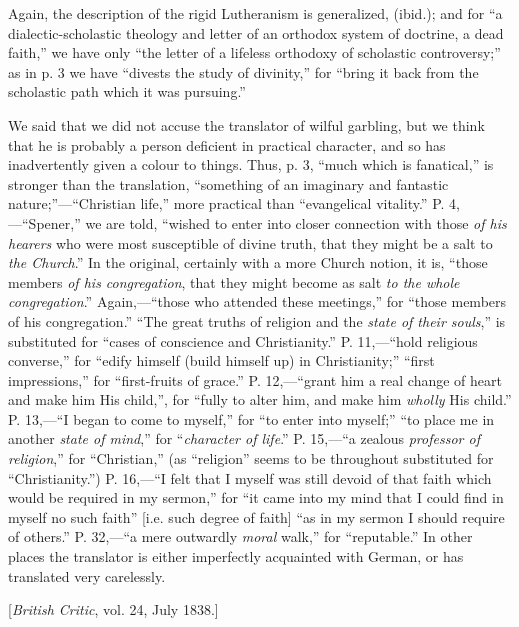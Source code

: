 Again, the description of the rigid Lutheranism is
generalized, (ibid.); and for ``a dialectic-scholastic theology and
letter of an orthodox system of doctrine, a dead faith,'' we have only ``the
letter of a lifeless orthodoxy of scholastic controversy;'' as in p. 3 we
have ``divests the study of divinity,'' for ``bring it back from the
scholastic path which it was pursuing.''

We said that we did not accuse the translator of
wilful garbling, but we think that he is probably a person deficient in
practical character, and so has inadvertently given a colour to things.
Thus, p. 3, ``much which is fanatical,'' is stronger than the translation,
``something of an imaginary and fantastic nature;''—``Christian life,''
more practical than ``evangelical vitality.'' P. 4,—``Spener,'' we are
told, ``wished to enter into closer connection with those \emph{of his
hearers} who were most susceptible of divine truth, that they might
be a salt to \emph{the Church}.'' In the original, certainly with a more
Church notion, it is, ``those members \emph{of his congregation}, that
they might become as salt \emph{to the whole congregation}.'' Again,—``those
who attended these meetings,'' for ``those members of his congregation.'' ``The
great truths of religion and the \emph{state of their souls},'' is
substituted for ``cases of conscience and Christianity.'' P. 11,—``hold
religious converse,'' for ``edify himself (build himself up) in
Christianity;'' ``first impressions,'' for ``first-fruits of grace.'' P.
12,—``grant him a real change of heart and make him His child,'', for ``fully
to alter him, and make him \emph{wholly} His child.'' P. 13,—``I began
to come to myself,'' for ``to enter into myself;'' ``to place me in another \emph{state
of mind},'' for ``\emph{character of life}.'' P. 15,—``a zealous \emph{professor
of religion},'' for ``Christian,'' (as ``religion'' seems to be throughout
substituted for ``Christianity.'') P. 16,—``I felt that I myself was
still devoid of that faith which would be required in my sermon,'' for ``it
came into my mind that I could find in myself no such faith'' [i.e. such
degree of faith] ``as in my sermon I should require of others.'' P. 32,—``a
mere outwardly \emph{moral} walk,'' for ``reputable.'' In other places the
translator is either imperfectly acquainted with German, or has
translated very carelessly.


[\emph{British Critic}, vol. 24, July 1838.]


